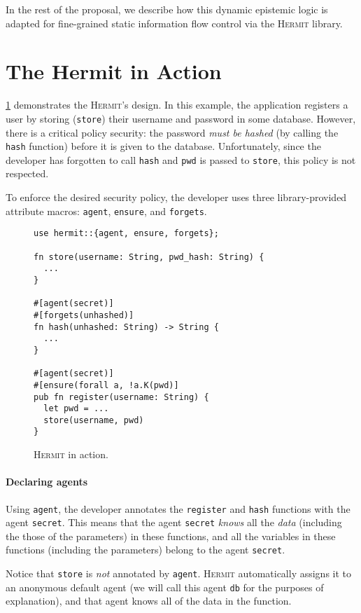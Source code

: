 \documentclass[letterpaper,twocolumn,10pt]{article}
\newcommand{\Hermit}{\textsc{Hermit}}
\begin{document}
In the rest of the proposal, we describe how this dynamic epistemic logic is adapted for
fine-grained static information flow control via the \Hermit{} library.

\section{The Hermit in Action}

\cref{fig:example} demonstrates the \Hermit's design. In this example, the application registers a
user by storing (\lstinline{store}) their username and password in some database. However, there is
a critical policy security: the password \emph{must be hashed} (by calling the \lstinline{hash}
function) before it is given to the database. Unfortunately, since the developer has forgotten to
call \lstinline{hash} and \lstinline{pwd} is passed to \lstinline{store}, this policy is not
respected.

To enforce the desired security policy, the developer uses three library-provided attribute macros:
\lstinline{agent}, \lstinline{ensure}, and \lstinline{forgets}.

\begin{figure}
  \centering
  \begin{lstlisting}
use hermit::{agent, ensure, forgets};

fn store(username: String, pwd_hash: String) {
  ...
}

#[agent(secret)]
#[forgets(unhashed)]
fn hash(unhashed: String) -> String {
  ...
}

#[agent(secret)]
#[ensure(forall a, !a.K(pwd)]
pub fn register(username: String) {
  let pwd = ...
  store(username, pwd)
}
  \end{lstlisting}
  \caption{\Hermit{} in action.}
  \label{fig:example}
\end{figure}

\paragraph{Declaring agents}
Using \lstinline{agent}, the developer annotates the \lstinline{register} and \lstinline{hash}
functions with the agent \lstinline{secret}. This means that the agent \lstinline{secret}
\emph{knows} all the \emph{data} (including the those of the parameters) in these functions, and all
the variables in these functions (including the parameters) belong to the agent \lstinline{secret}.

Notice that \lstinline{store} is \emph{not} annotated by \lstinline{agent}. \Hermit{} automatically
assigns it to an anonymous default agent (we will call this agent \lstinline{db} for the purposes of
explanation), and that agent knows all of the data in the function.
\end{document}

